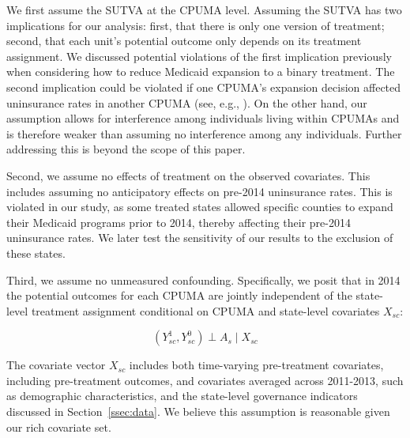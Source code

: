 \documentclass[aoas]{imsart}
\theoremstyle{plain}
\theoremstyle{remark}
\begin{document}
We first assume the SUTVA at the CPUMA level. Assuming the SUTVA has two implications for our analysis: first, that there is only one version of treatment; second, that each unit's potential outcome only depends on its treatment assignment. We discussed potential violations of the first implication previously when considering how to reduce Medicaid expansion to a binary treatment. The second implication could be violated if one CPUMA's expansion decision affected uninsurance rates in another CPUMA (see, e.g., \citet{frean2017premium}). On the other hand, our assumption allows for interference among individuals living within CPUMAs and is therefore weaker than assuming no interference among any individuals. Further addressing this is beyond the scope of this paper.

Second, we assume no effects of treatment on the observed covariates. This includes assuming no anticipatory effects on pre-2014 uninsurance rates. This is violated in our study, as some treated states allowed specific counties to expand their Medicaid programs prior to 2014, thereby affecting their pre-2014 uninsurance rates. We later test the sensitivity of our results to the exclusion of these states.

Third, we assume no unmeasured confounding. Specifically, we posit that in 2014 the potential outcomes for each CPUMA are jointly independent of the state-level treatment assignment conditional on CPUMA and state-level covariates $X_{sc}$:

\begin{equation}\label{eqn:unconfoundedness}
(Y_{sc}^1, Y_{sc}^0) \perp A_s \mid X_{sc} 
\end{equation}

The covariate vector $X_{sc}$ includes both time-varying pre-treatment covariates, including pre-treatment outcomes, and covariates averaged across 2011-2013, such as demographic characteristics, and the state-level governance indicators discussed in Section~\ref{ssec:data}. We believe this assumption is reasonable given our rich covariate set. 
\end{document}
